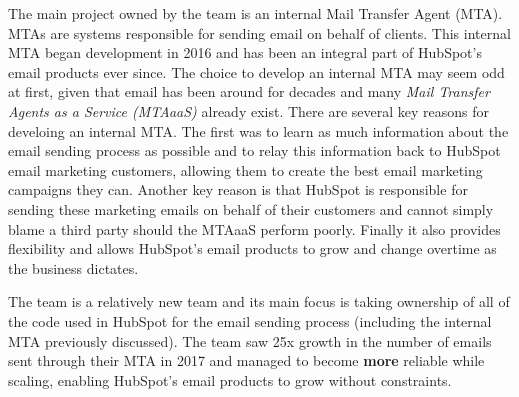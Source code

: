 The main project owned by the \team{} team is an internal Mail Transfer Agent (MTA). MTAs are systems responsible for sending email on behalf of clients. This internal MTA began development in 2016 and has been an integral part of HubSpot's email products ever since. The choice to develop an internal MTA may seem odd at first, given that email has been around for decades and many \textit{Mail Transfer Agents as a Service (MTAaaS)} already exist. There are several key reasons for develoing an internal MTA. The first was to learn as much information about the email sending process as possible and to relay this information back to HubSpot email marketing customers, allowing them to create the best email marketing campaigns they can. Another key reason is that HubSpot is responsible for sending these marketing emails on behalf of their customers and cannot simply blame a third party should the MTAaaS perform poorly. Finally it also provides flexibility and allows HubSpot's email products to grow and change overtime as the business dictates.  

The \team{} team is a relatively new team and its main focus is taking ownership of all of the code used in HubSpot for the email sending process (including the internal MTA previously discussed). The team saw 25x growth in the number of emails sent through their MTA in 2017 and managed to become \textbf{more} reliable while scaling, enabling HubSpot's email products to grow without constraints.  